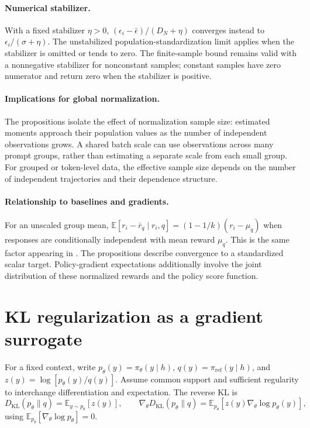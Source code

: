 \paragraph{Numerical stabilizer.}
With a fixed stabilizer $\eta>0$, $(\epsilon_i-\bar\epsilon)/(D_N+\eta)$ converges instead to $\epsilon_i/(\sigma+\eta)$. The unstabilized population-standardization limit applies when the stabilizer is omitted or tends to zero. The finite-sample bound remains valid with a nonnegative stabilizer for nonconstant samples; constant samples have zero numerator and return zero when the stabilizer is positive.

\paragraph{Implications for global normalization.}
The propositions isolate the effect of normalization sample size: estimated moments approach their population values as the number of independent observations grows. A shared batch scale can use observations across many prompt groups, rather than estimating a separate scale from each small group. For grouped or token-level data, the effective sample size depends on the number of independent trajectories and their dependence structure.

\paragraph{Relationship to baselines and gradients.}
For an unscaled group mean, $\mathbb{E}[r_i-\bar r_q\mid r_i,q]=(1-1/k)(r_i-\mu_q)$ when responses are conditionally independent with mean reward $\mu_q$. This is the same factor appearing in . The propositions describe convergence to a standardized scalar target. Policy-gradient expectations additionally involve the joint distribution of these normalized rewards and the policy score function.


\section{KL regularization as a gradient surrogate}\label{appendix:kl}\label{appendix:kl_design}
For a fixed context, write $p_\theta(y)=\pi_\theta(y\mid h)$, $q(y)=\pi_{\mathrm{ref}}(y\mid h)$, and $z(y)=\log[p_\theta(y)/q(y)]$. Assume common support and sufficient regularity to interchange differentiation and expectation. The reverse KL is
\begin{equation}
 D_{\mathrm{KL}}(p_\theta\|q)=\mathbb{E}_{y\sim p_\theta}[z(y)],
 \qquad
 \nabla_\theta D_{\mathrm{KL}}(p_\theta\|q)
 =\mathbb{E}_{p_\theta}[z(y)\nabla_\theta\log p_\theta(y)],
 \label{eq:rkl_gradient}
\end{equation}
using $\mathbb{E}_{p_\theta}[\nabla_\theta\log p_\theta]=0$.

